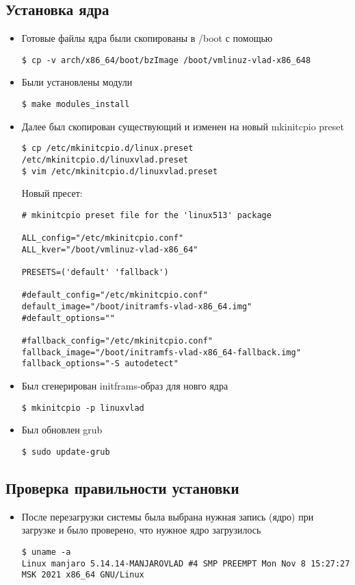 \documentclass[a4paper]{article}
\begin{document}
    \subsection{Установка ядра}
    \begin{itemize}
        \item Готовые файлы ядра были скопированы в /boot с помощью
        \begin{verbatim}
$ cp -v arch/x86_64/boot/bzImage /boot/vmlinuz-vlad-x86_648
        \end{verbatim}
        \item Были установлены модули
        \begin{verbatim}
$ make modules_install
        \end{verbatim}
        \item Далее был скопирован существующий и изменен на новый mkinitcpio preset
        \begin{verbatim}
$ cp /etc/mkinitcpio.d/linux.preset /etc/mkinitcpio.d/linuxvlad.preset
$ vim /etc/mkinitcpio.d/linuxvlad.preset
        \end{verbatim}
        Новый пресет:
        \begin{verbatim}
# mkinitcpio preset file for the 'linux513' package

ALL_config="/etc/mkinitcpio.conf"
ALL_kver="/boot/vmlinuz-vlad-x86_64"

PRESETS=('default' 'fallback')

#default_config="/etc/mkinitcpio.conf"
default_image="/boot/initramfs-vlad-x86_64.img"
#default_options=""

#fallback_config="/etc/mkinitcpio.conf"
fallback_image="/boot/initramfs-vlad-x86_64-fallback.img"
fallback_options="-S autodetect"
        \end{verbatim}
        \item Был сгенерирован initframs-образ для новго ядра
        \begin{verbatim}
$ mkinitcpio -p linuxvlad
        \end{verbatim}
        \item Был обновлен grub
        \begin{verbatim}
$ sudo update-grub
        \end{verbatim}
    \end{itemize}

    \subsection{Проверка правильности установки}
    \begin{itemize}
        \item После перезагрузки системы была выбрана нужная запись (ядро) при загрузке и было проверено,
        что нужное ядро загрузилось
        \begin{verbatim}
$ uname -a
Linux manjaro 5.14.14-MANJAROVLAD #4 SMP PREEMPT Mon Nov 8 15:27:27
MSK 2021 x86_64 GNU/Linux
        \end{verbatim}
    \end{itemize}
\end{document}
